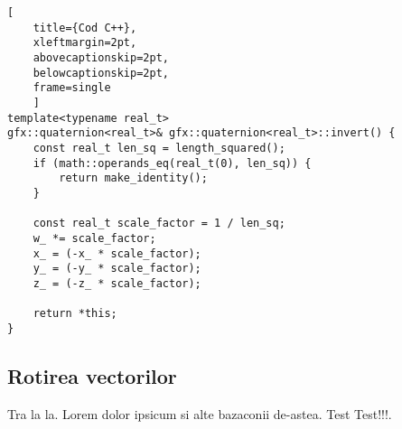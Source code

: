 \begin{lstlisting}[
    title={Cod C++}, 
    xleftmargin=2pt,
    abovecaptionskip=2pt,
    belowcaptionskip=2pt,
    frame=single
    ]
template<typename real_t>
gfx::quaternion<real_t>& gfx::quaternion<real_t>::invert() {
    const real_t len_sq = length_squared();
    if (math::operands_eq(real_t(0), len_sq)) {
        return make_identity();
    }

    const real_t scale_factor = 1 / len_sq;
    w_ *= scale_factor;
    x_ = (-x_ * scale_factor);
    y_ = (-y_ * scale_factor);
    z_ = (-z_ * scale_factor);

    return *this;
}
\end{lstlisting}

\subsection{Rotirea vectorilor}
\label{ch1:quaternions:vector_rotation}
Tra la la. Lorem dolor ipsicum si alte bazaconii de-astea. Test Test!!!.